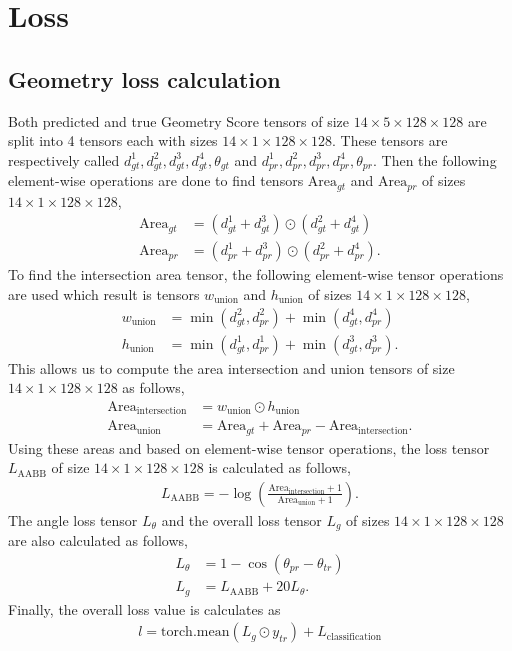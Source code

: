 \documentclass[10pt, etterpaper]{article}
\begin{document}
\newpage
\section{Loss}
\subsection{Geometry loss calculation}
Both predicted and true Geometry Score tensors of size $14 \times 5 \times 128 \times 128$ are split into 4 tensors each with sizes $14 \times 1 \times 128 \times 128$. These tensors are respectively called $d^1_{gt}, d^2_{gt}, d^3_{gt}, d^4_{gt}, {\theta}_{gt}$ and $d^1_{pr}, d^2_{pr}, d^3_{pr}, d^4_{pr}, {\theta}_{pr}$. Then the following element-wise operations are done to find tensors $\textrm{Area}_{gt}$ and $\textrm{Area}_{pr}$ of sizes $14 \times 1 \times 128 \times 128$,
\begin{align}
\textrm{Area}_{gt} &= (d^1_{gt} + d^3_{gt}) \odot  (d^2_{gt} + d^4_{gt}) \\
\textrm{Area}_{pr} &= (d^1_{pr} + d^3_{pr}) \odot  (d^2_{pr} + d^4_{pr}).
\end{align}
To find the intersection area tensor, the following element-wise tensor operations are used  which result is tensors $w_{\textrm{union}}$ and $h_{\textrm{union}}$ of sizes $14 \times 1 \times 128 \times 128$, 
\begin{align}
w_{\textrm{union}} &= \min (d^2_{gt}, d^2_{pr}) + \min ( d^4_{gt}, d^4_{pr})  \\
h_{\textrm{union}} &= \min (d^1_{gt}, d^1_{pr}) + \min ( d^3_{gt}, d^3_{pr}). 
\end{align}
This allows us to compute the area intersection and union tensors  of size $14 \times 1 \times 128 \times 128$ as follows,
\begin{align}
\textrm{Area}_{\textrm{intersection}} &= w_{\textrm{union}} \odot h_{\textrm{union}} \\
\textrm{Area}_{\textrm{union}} &= 
\textrm{Area}_{gt} + \textrm{Area}_{pr} -
\textrm{Area}_{\textrm{intersection}}.
\end{align}
Using these areas and based on element-wise tensor operations, the loss tensor $L_{\textrm{AABB}}$ of  size $14 \times 1 \times 128 \times 128$ is calculated as follows,
\begin{align}
L_{\textrm{AABB}} = - \log \left( \frac{\textrm{Area}_{\textrm{intersection}} + 1}{ \textrm{Area}_{\textrm{union}}+ 1}\right).
\end{align}
The angle loss tensor $L_{\theta}$ and the overall loss tensor $L_g$ of sizes $14 \times 1 \times 128 \times 128$ are also calculated as follows,
\begin{align}
L_{\theta} &= 1 - \cos \left( \theta_{pr} - \theta_{tr} \right) \\
L_{g} &= L_{\textrm{AABB}}  + 20 L_{\theta}.
\end{align}
Finally, the overall loss value is calculates as 
\begin{align}
l = \textrm{torch.mean}( L_g \odot y_{tr}) + L_{\textrm{classification}} 
\end{align}
\end{document}
